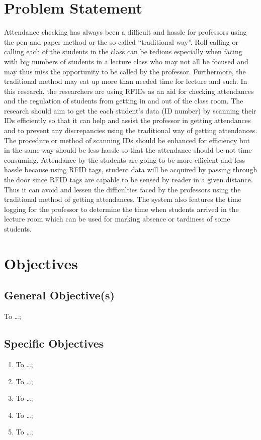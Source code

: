 \section{Problem Statement}

Attendance checking has always been a difficult and hassle for professors using the pen and paper method or the so called “traditional way”. Roll calling or calling each of the students in the class can be tedious especially when facing with big numbers of students in a lecture class who may not all be focused and may thus miss the opportunity to be called by the professor. Furthermore, the traditional method may eat up more than needed time for lecture and such.  
	In this research, the researchers are using RFIDs as an aid for checking attendances and the regulation of students from getting in and out of the class room.  The research should aim to get the each student’s data (ID number) by scanning their IDs efficiently so that it can help and assist the professor in getting attendances and to prevent any discrepancies using the traditional way of getting attendances.  The procedure or method of scanning IDs should be enhanced for efficiency but in the same way should be less hassle so that the attendance should be not time consuming.  
	Attendance by the students are going to be more efficient and less hassle because using RFID tags, student data will be acquired by passing through the door since RFID tags are capable to be sensed by reader in a given distance.  Thus it can avoid and lessen the difficulties faced by the professors using the traditional method of getting attendances.  The system also features the time logging for the professor to determine the time when students arrived in the lecture room which can be used for marking absence or tardiness of some students.  

\section{Objectives}
\subsection{General Objective(s)}
To \ldots;

\subsection{Specific Objectives}

\begin{enumerate}
	\item To  \ldots;
	
	\item To  \ldots;
	
	\item To  \ldots;
	
	\item To  \ldots;
	
	\item To  \ldots;
\end{enumerate}



